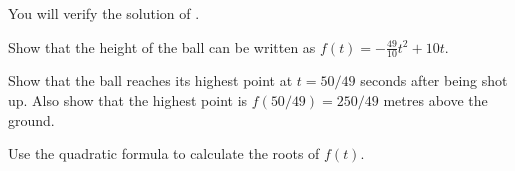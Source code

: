 \documentclass[a4paper,oneside,12pt]{article}
\begin{document}
\begin{exercise}
You will verify the solution of .
\begin{packedenum}
\item\label{subex:spring_ball_height_function}
  Show that the height of the ball can be written as
  $f(t) = -\frac{49}{10} t^2 + 10t$.

\item\label{subex:spring_ball_highest_point}
  Show that the ball reaches its highest point at $t = 50 / 49$
  seconds after being shot up.  Also show that the highest point is
  $f(50 / 49) = 250 / 49$ metres above the ground.

\item\label{subex:spring_ball_quadratic_formula}
  Use the quadratic formula to calculate the roots of $f(t)$.
\end{packedenum}
\end{exercise}
\end{document}
